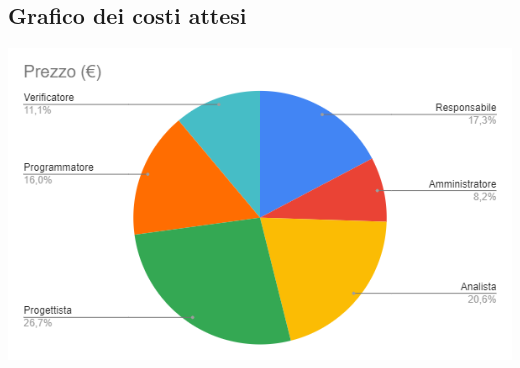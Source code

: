 \documentclass[a4paper, 12pt]{article}
\begin{document}
\subsection{Grafico dei costi attesi}
\includegraphics{grafico_costi.png}
\end{document}
